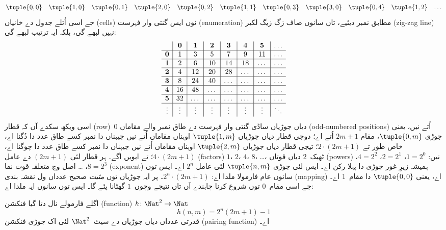 \documentclass[../../../include/open-logic-section]{subfiles}
\begin{document}
\begin{explain}
\[\begin{array}{@{}cc c c c c c c c c c@{}}
\tuple{0,0} & \tuple{1,0} & \tuple{0,1} & \tuple{2,0}  & \tuple{0,2} &
\tuple{1,1} & \tuple{0,3} & \tuple{3,0}  & \tuple{0,4} &  \tuple{1,2} & \dots \\
\end{array}
\]
جے اسی اُتلے جدول دے خانیاں (cells) نوں ایس گنتی وار فہرست (enumeration)
مطابق نمبر دیئیے، تاں سانوں صاف زگ زیگ لکیر (zig-zag line) نہیں لبھے
گی، بلکہ ایہ ترتیب لبھے گی:
\[
\begin{array}{ c | c | c | c | c | c | c | c }
& \mathbf 0 & \mathbf 1 & \mathbf 2 & \mathbf 3 & \mathbf 4 & \mathbf 5 & \dots \\
\hline
\mathbf 0 & 1 & 3 & 5 & 7 & 9 & 11 & \dots \\
\hline
\mathbf 1 & 2 & 6 & 10 & 14 & 18 & \dots & \dots \\
\hline
\mathbf 2 & 4 & 12 & 20 & 28 & \dots & \dots & \dots \\
\hline
\mathbf 3 & 8 & 24 & 40 & \dots & \dots & \dots & \dots \\
\hline
\mathbf 4 & 16 & 48 & \dots & \dots & \dots & \dots & \dots \\
\hline
\mathbf 5 & 32 & \dots & \dots & \dots & \dots & \dots & \dots \\
\hline
\vdots & \vdots & \vdots & \vdots & \vdots & \vdots & \vdots & \ddots\\
\end{array}
\]
اسی ویکھ سکدے آں کہ قطار (row)~$0$ دیاں جوڑیاں ساڈی گنتی وار فہرست دے
طاق نمبر والے مقاماں (odd-numbered positions) اُتے نیں، یعنی جوڑی $\tuple{0,m}$، مقام $2m+1$
اُتے اے؛ دوجی قطار دیاں جوڑیاں $\tuple{1,m}$ اوہناں مقاماں اُتے نیں
جیہناں دا نمبر کسے طاق عدد دا دُگنا اے، خاص طور تے $2 \cdot (2m+1)$؛
تیجی قطار دیاں جوڑیاں $\tuple{2,m}$ اوہناں مقاماں اُتے نیں جیہناں دا
نمبر کسے طاق عدد دا چوگنا اے، $4 \cdot (2m+1)$؛ تے ایویں اگے۔ ہر قطار
لئی $(2m+1)$ دے عامل (factors) $1$، $2$، $4$، $8$، \dots، ٹھیک~$2$ دیاں
قوتاں (powers) نیں: $1= 2^0$، $2 = 2^1$، $4 = 2^2$، $8 = 2^3$، \dots\@
اصل وچ متعلقہ قوت نما (exponent) ہمیشہ زیرِ غور جوڑی دا پہلا رکن اے۔ ایس لئی جوڑی
$\tuple{n,m}$ لئی عامل $2^n$ اے۔ ایس توں سانوں عام فارمولا ملدا اے:
$2^n \cdot (2m+1)$۔ پر ایہ جوڑیاں توں \emph{مثبت} صحیح عدداں ول نقشہ
بندی (mapping) اے، یعنی $\tuple{0,0}$ دا مقام~$1$ اے۔ جے اسی مقام~$0$ توں شروع
کرنا چاہندے آں تاں نتیجے وچوں~$1$ گھٹانا پئے گا۔ ایس توں سانوں ایہ
ملدا اے:
\end{explain}

\begin{ex}
اگلے فارمولے نال دتا گیا فنکشن (function) $h\colon \Nat^2 \to \Nat$
\[
h(n,m) = 2^n (2m+1) - 1
\]
قدرتی عدداں دیاں جوڑیاں دے سیٹ~$\Nat^2$ لئی اک جوڑی فنکشن (pairing function) اے۔
\end{ex}
\end{document}
